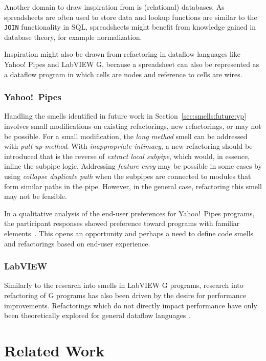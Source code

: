 \documentclass[10pt,conference,compsocconf]{IEEEtran}
\begin{document}
Another domain to draw inspiration from is (relational) databases.
As spreadsheets are often used to store data and lookup functions are similar to the \texttt{JOIN} functionality in SQL, spreadsheets might benefit from knowledge gained in database theory, for example normalization.

Inspiration might also be drawn from refactoring in dataflow languages like Yahoo! Pipes and LabVIEW G, because a spreadsheet can also be represented as a dataflow program in which cells are nodes and reference to cells are wires.

\subsubsection{Yahoo!\ Pipes}
Handling the smells identified in future work in Section~\ref{sec:smells:future:yp} involves small modifications on existing refactorings, new refactorings, or may not be possible. For a small modification, the \emph{long method} smell can be addressed with \emph{pull up method}. 
With \emph{inappropriate intimacy}, a new refactoring should be introduced that is the reverse of \emph{extract local subpipe}, which would, in essence, inline the subpipe logic. 
Addressing \emph{feature envy} may be possible in some cases by using \emph{collapse duplicate path} when the subpipes are connected to modules that form similar paths in the pipe. However, in the general case, refactoring this smell may not be feasible. 

In a qualitative analysis of the end-user preferences for Yahoo!\ Pipes programs, the participant responses showed preference toward programs with familiar elements~\cite{Stolee2015}. This opens an opportunity and perhaps a need to define code smells and refactorings based on end-user experience. 

\subsubsection{LabVIEW}

Similarly to the research into smells in LabVIEW G programs, research into refactoring of G programs has also been driven by the desire for performance improvements. Refactorings which do not directly impact performance have only been theoretically explored for general dataflow languages \cite{sui2008automated}.

\section{Related Work}
\label{sec:related_work}
\end{document}
